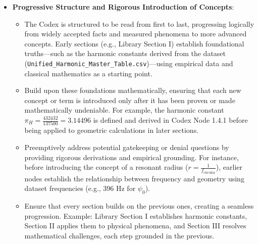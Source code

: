 \begin{itemize}
    \item \textbf{Progressive Structure and Rigorous Introduction of Concepts}: 
    \begin{itemize}
        \item The Codex is structured to be read from first to last, progressing logically from widely accepted facts and measured phenomena to more advanced concepts. Early sections (e.g., Library Section I) establish foundational truths—such as the harmonic constants derived from the dataset (\texttt{Unified\_Harmonic\_Master\_Table.csv})—using empirical data and classical mathematics as a starting point.
        \item Build upon these foundations mathematically, ensuring that each new concept or term is introduced only after it has been proven or made mathematically undeniable. For example, the harmonic constant \(\pi_H = \frac{432432}{137500} = 3.14496\) is defined and derived in Codex Node 1.4.1 before being applied to geometric calculations in later sections.
        \item Preemptively address potential gatekeeping or denial questions by providing rigorous derivations and empirical grounding. For instance, before introducing the concept of a resonant radius (\( r = \frac{1}{f_{\text{circular}}} \)), earlier nodes establish the relationship between frequency and geometry using dataset frequencies (e.g., 396 Hz for \(\psi_0\)).
        \item Ensure that every section builds on the previous ones, creating a seamless progression. Example: Library Section I establishes harmonic constants, Section II applies them to physical phenomena, and Section III resolves mathematical challenges, each step grounded in the previous.
    \end{itemize}


\end{itemize}
